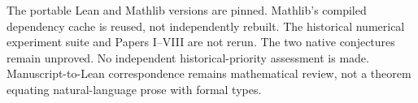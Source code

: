 \documentclass[11pt]{article}
\begin{document}
The portable Lean and Mathlib versions are pinned. Mathlib's compiled dependency cache is reused, not independently rebuilt. The historical numerical experiment suite and Papers I--VIII are not rerun. The two native conjectures remain unproved. No independent historical-priority assessment is made. Manuscript-to-Lean correspondence remains mathematical review, not a theorem equating natural-language prose with formal types.
\end{document}
